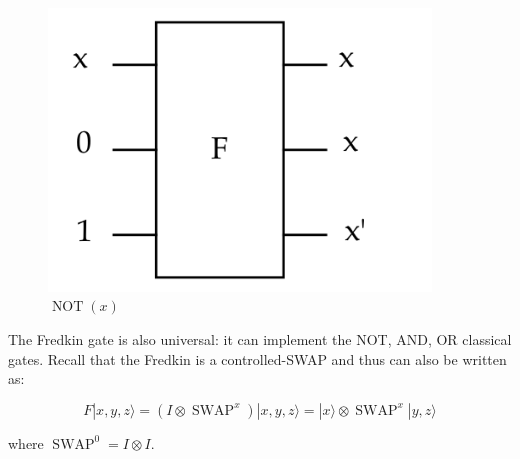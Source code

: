 \documentclass[main.tex]{subfiles}
\begin{document}
    \begin{figure}
        \centering
        \includegraphics[width=4in]{notes/figs/n10/21fredkin2.png}
        \caption{$\operatorname{NOT}(x)$}
        \label{fig:21fredkin2}
    \end{figure}
    
    The Fredkin gate is also universal: it can implement the NOT, AND, OR classical gates. Recall that the Fredkin is a controlled-SWAP and thus can also be written as:
    
    $$
    F|x, y, z\rangle=\left(I \otimes \operatorname{SWAP}^{x}\right)|x, y, z\rangle=|x\rangle \otimes \operatorname{SWAP}^{x}|y, z\rangle
    $$
    
    where $\operatorname{SWAP}^{0}=I \otimes I$.
    
\end{document}

